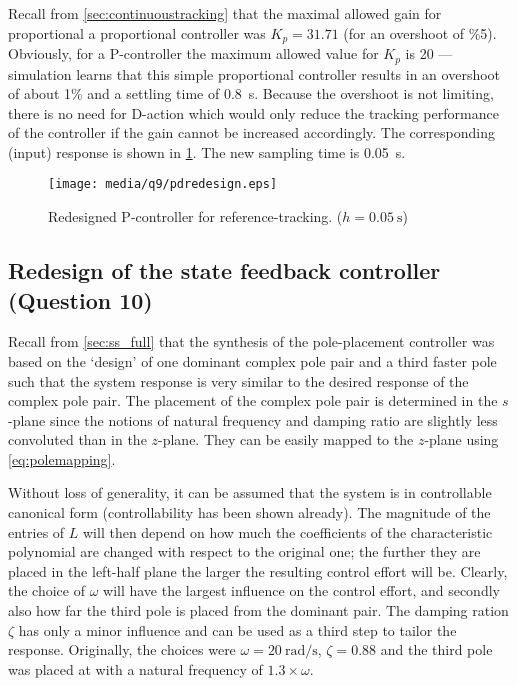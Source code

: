 Recall from \cref{sec:continuoustracking} that the maximal allowed gain for proportional a proportional controller was $K_p = 31.71$ (for an overshoot of \%5). Obviously, for a P-controller the maximum allowed value for $K_p$ is 20 --- simulation learns that this simple proportional controller results in an overshoot of about 1\% and a settling time of \SI{0.8}{\second}. Because the overshoot is not limiting, there is no need for D-action which would only reduce the tracking performance of the controller if the gain cannot be increased accordingly. The corresponding (input) response is shown in \cref{fig:q9_pdredesign}. The new sampling time is \SI{0.05}{\second}.
\begin{figure}[ht]
    \centering
    \texttt{[image: media/q9/pdredesign.eps]}
    \caption{Redesigned P-controller for reference-tracking. ($h = \SI{0.05}{\second}$)}
    \label{fig:q9_pdredesign}
\end{figure}
\FloatBarrier

\subsection{Redesign of the state feedback controller \textnormal{\phantom{xxx}(Question 10)}}
\label{sec:retunepolep}
Recall from \cref{sec:ss_full} that the synthesis of the pole-placement controller was based on the `design' of one dominant complex pole pair and a third faster pole such that the system response is very similar to the desired response of the complex pole pair. The placement of the complex pole pair is determined in the $s$-plane since the notions of natural frequency and damping ratio are slightly less convoluted than in the $z$-plane. They can be easily mapped to the $z$-plane using \cref{eq:polemapping}.

Without loss of generality, it can be assumed that the system is in controllable canonical form (controllability has been shown already). The magnitude of the entries of $L$ will then depend on how much the coefficients of the characteristic polynomial are changed with respect to the original one; the further they are placed in the left-half plane the larger the resulting control effort will be. Clearly, the choice of $\omega$ will have the largest influence on the control effort, and secondly also how far the third pole is placed from the dominant pair. The damping ration $\zeta$ has only a minor influence and can be used as a third step to tailor the response. Originally, the choices were $\omega = \SI{20}{\radian\per\second}$, $\zeta = 0.88$ and the third pole was placed at with a natural frequency of $1.3\times\omega$.


